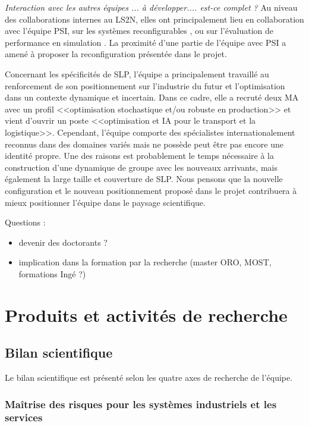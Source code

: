 \textit{Interaction avec les autres équipes ... à développer.... est-ce complet ?}
Au niveau des collaborations internes au LS2N, elles ont principalement lieu en collaboration avec l'équipe PSI, sur les systèmes reconfigurables  \cite{lameche:hal-02354553, kouiss:hal-02354412}, ou sur l'évaluation de performance en simulation \cite{indriago:hal-01693153,indriago:hal-01628882}. 
La proximité d'une partie de l'équipe avec PSI a amené à proposer la reconfiguration présentée dans le projet.

Concernant les spécificités de SLP, l'équipe a principalement travaillé au renforcement de son positionnement sur l'industrie du futur et l'optimisation dans un contexte dynamique et incertain. Dans ce cadre, elle a recruté deux MA avec un profil <<optimisation stochastique et/ou robuste en production>> et vient d'ouvrir un poste <<optimisation et IA pour le transport et la logistique>>. 
Cependant, l'équipe comporte des spécialistes internationalement reconnus dans des domaines variés mais ne possède peut être pas encore une identité propre. Une des raisons est probablement le temps nécessaire à la construction d'une dynamique de groupe avec les nouveaux arrivants, mais également la large taille et couverture de SLP. 
Nous pensons que la nouvelle configuration et le nouveau positionnement proposé dans le projet contribuera à mieux positionner l'équipe dans le paysage scientifique. 

Questions : 
\begin{itemize}
    \item devenir des doctorants ?
    \item implication dans la formation par la recherche (master ORO, MOST, formations Ingé ?)
\end{itemize}


  \vfill
\rule[\baselineskip]{0pt}{\baselineskip}
 \section{Produits et activités de recherche}
 	
\subsection{Bilan scientifique}

Le bilan scientifique est présenté selon les quatre axes de recherche de l'équipe. 		

\subsubsection{Maîtrise des risques pour les systèmes industriels et les services}

